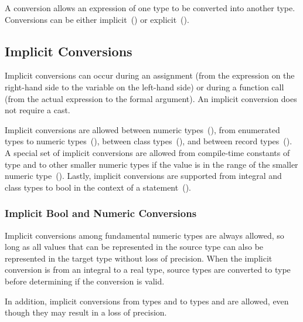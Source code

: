 \label{Conversions}

A conversion allows an expression of one type to be converted into
another type.  Conversions can be either
implicit~() or
explicit~().

\subsection{Implicit Conversions}
\label{Implicit_Conversions}

Implicit conversions can occur during an assignment (from the
expression on the right-hand side to the variable on the left-hand
side) or during a function call (from the actual expression to the
formal argument).  An implicit conversion does not require a cast.

Implicit conversions are allowed between numeric
types~(), from enumerated types to
numeric types~(), between class
types~(), and between record
types~().  A special set of implicit
conversions are allowed from compile-time constants of type 
and  to other smaller numeric types if the value is in
the range of the smaller numeric
type~().  Lastly,
implicit conversions are supported from integral and class types to
bool in the context of a
statement~().

\subsubsection{Implicit Bool and Numeric Conversions}
\label{Implicit_Numeric_Conversions}

Implicit conversions among fundamental numeric types are always allowed, so long as all
values that can be represented in the source type can also be represented in the
target type without loss of precision.
When the implicit conversion is from an integral to a real type, source
types are converted to type  before determining if the
conversion is valid.

In addition, implicit conversions from
types  and  to types 
and  are allowed, even though they may result in a loss of
precision.

